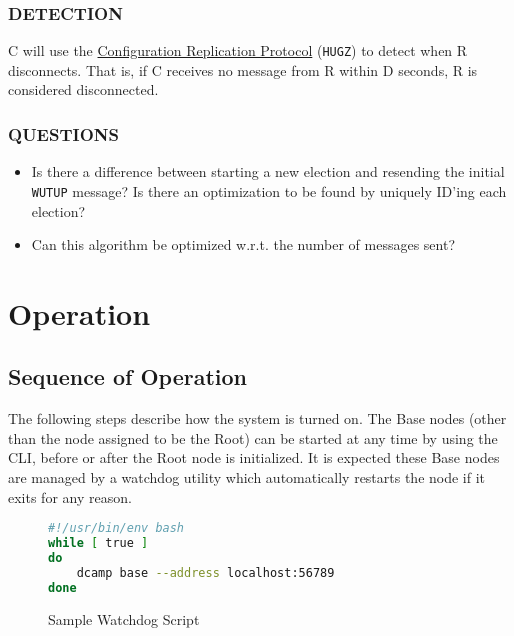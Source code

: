 \subsubsection{DETECTION}

C will use the \hyperref[proto_config]{Configuration Replication Protocol} (\texttt{HUGZ}) to detect when R disconnects.
That is, if C receives no message from R within D seconds, R is considered disconnected.

\subsubsection{QUESTIONS}

\begin{itemize}
\item Is there a difference between starting a new election and resending the initial \texttt{WUTUP} message? Is there
      an optimization to be found by uniquely ID'ing each election?
\item Can this algorithm be optimized w.r.t. the number of messages sent?
\end{itemize}

\section{\dcamp Operation}

\subsection{Sequence of \dcamp Operation}
\label{operation_sequnce}

The following steps describe how the \dcamp system is turned on. The Base nodes (other than the node assigned to be the
Root) can be started at any time by using the \dcamp CLI, before or after the Root node is initialized. It is expected
these Base nodes are managed by a watchdog utility which automatically restarts the node if it exits for any reason.

\begin{figure}[H]
\vspace{+10pt}
\begin{lstlisting}[language=bash,frame=single,basicstyle=\footnotesize\ttfamily]
#!/usr/bin/env bash
while [ true ]
do
    dcamp base --address localhost:56789
done
\end{lstlisting}
\vspace{-10pt}
\caption{Sample Watchdog Script}
\label{fig:sample_watchdog}
\end{figure}

